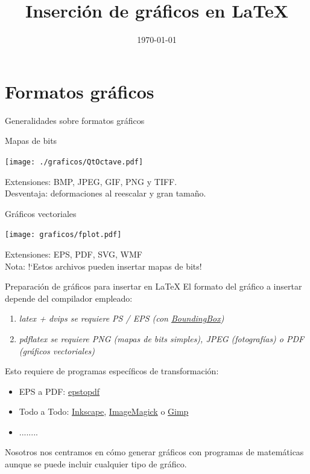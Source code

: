 \documentclass{beamer}
\title[Taller de \LaTeX]{Inserci\'on de gr\'aficos en \LaTeX}
\author[O. S\'anchez]{}
\institute[UGR]{Universidad de Granada}
\date{\today}
\begin{document}
\maketitle

\section{Formatos gr\'aficos}
\begin{frame}{Generalidades sobre formatos gr\'aficos}
\begin{block}{Mapas de bits} 
\begin{center}
\texttt{[image: ./graficos/QtOctave.pdf]}
\end{center}
Extensiones: BMP, JPEG, GIF, PNG y TIFF. \\
{\small Desventaja: deformaciones al reescalar y gran tama\~no.}
\end{block}
\end{frame}
\begin{frame}
\begin{block} {Gr\'aficos vectoriales} 
\begin{center}
\texttt{[image: graficos/fplot.pdf]}
\end{center}
Extensiones: EPS, PDF, SVG, WMF \\
{\small Nota: !`Estos archivos pueden insertar mapas de bits! }
\end{block}
\end{frame}


\begin{frame}{Preparaci\'on de gr\'aficos para insertar en \LaTeX}
El formato del gr\'afico a insertar depende del compilador empleado:
\begin{enumerate}
\item \it{latex + dvips}  se requiere PS / EPS {\scriptsize(con \href{http://tex.stackexchange.com/questions/133786/no-boundingbox-error-message}{BoundingBox})}
\item \it {pdflatex} se requiere PNG {\scriptsize(mapas de bits simples)}, JPEG {\scriptsize(fotograf\'ias)} o PDF {\scriptsize(gr\'aficos vectoriales)}
\end{enumerate}

\vspace{0.5cm}
Esto requiere de programas espec\'ificos de transformaci\'on:
\begin{itemize}
\item {\sc EPS a PDF}: \href{http://tug.org/epstopdf/}{epstopdf}
\item {\sc Todo a Todo}: \href{http://www.inkscape.org/es/}{Inkscape}, 
\href{http://www.imagemagick.org}{ImageMagick} o \href{http://www.gimp.org/}{Gimp}
\item ........
\end{itemize}
Nosotros nos centramos en c\'omo generar gr\'aficos con programas de matem\'aticas aunque se puede incluir 
cualquier tipo de gr\'afico.
\end{frame}
\end{document}
